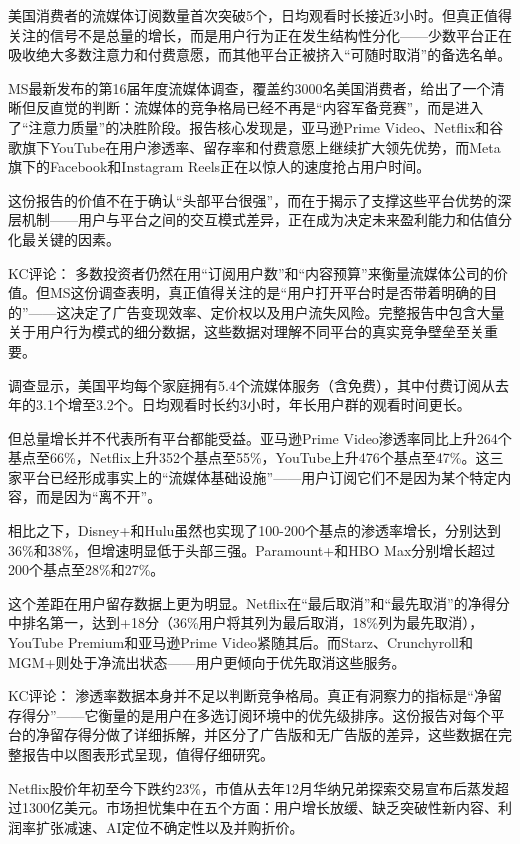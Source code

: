 \documentclass[11pt]{ctexart}
\begin{document}
美国消费者的流媒体订阅数量首次突破5个，日均观看时长接近3小时。但真正值得关注的信号不是总量的增长，而是用户行为正在发生结构性分化——少数平台正在吸收绝大多数注意力和付费意愿，而其他平台正被挤入“可随时取消”的备选名单。

MS最新发布的第16届年度流媒体调查，覆盖约3000名美国消费者，给出了一个清晰但反直觉的判断：流媒体的竞争格局已经不再是“内容军备竞赛”，而是进入了“注意力质量”的决胜阶段。报告核心发现是，亚马逊Prime Video、Netflix和谷歌旗下YouTube在用户渗透率、留存率和付费意愿上继续扩大领先优势，而Meta旗下的Facebook和Instagram Reels正在以惊人的速度抢占用户时间。

这份报告的价值不在于确认“头部平台很强”，而在于揭示了支撑这些平台优势的深层机制——用户与平台之间的交互模式差异，正在成为决定未来盈利能力和估值分化最关键的因素。

KC评论： 多数投资者仍然在用“订阅用户数”和“内容预算”来衡量流媒体公司的价值。但MS这份调查表明，真正值得关注的是“用户打开平台时是否带着明确的目的”——这决定了广告变现效率、定价权以及用户流失风险。完整报告中包含大量关于用户行为模式的细分数据，这些数据对理解不同平台的真实竞争壁垒至关重要。

调查显示，美国平均每个家庭拥有5.4个流媒体服务（含免费），其中付费订阅从去年的3.1个增至3.2个。日均观看时长约3小时，年长用户群的观看时间更长。

但总量增长并不代表所有平台都能受益。亚马逊Prime Video渗透率同比上升264个基点至66\%，Netflix上升352个基点至55\%，YouTube上升476个基点至47\%。这三家平台已经形成事实上的“流媒体基础设施”——用户订阅它们不是因为某个特定内容，而是因为“离不开”。

相比之下，Disney+和Hulu虽然也实现了100-200个基点的渗透率增长，分别达到36\%和38\%，但增速明显低于头部三强。Paramount+和HBO Max分别增长超过200个基点至28\%和27\%。

这个差距在用户留存数据上更为明显。Netflix在“最后取消”和“最先取消”的净得分中排名第一，达到+18分（36\%用户将其列为最后取消，18\%列为最先取消），YouTube Premium和亚马逊Prime Video紧随其后。而Starz、Crunchyroll和MGM+则处于净流出状态——用户更倾向于优先取消这些服务。

KC评论： 渗透率数据本身并不足以判断竞争格局。真正有洞察力的指标是“净留存得分”——它衡量的是用户在多选订阅环境中的优先级排序。这份报告对每个平台的净留存得分做了详细拆解，并区分了广告版和无广告版的差异，这些数据在完整报告中以图表形式呈现，值得仔细研究。

Netflix股价年初至今下跌约23\%，市值从去年12月华纳兄弟探索交易宣布后蒸发超过1300亿美元。市场担忧集中在五个方面：用户增长放缓、缺乏突破性新内容、利润率扩张减速、AI定位不确定性以及并购折价。
\end{document}
